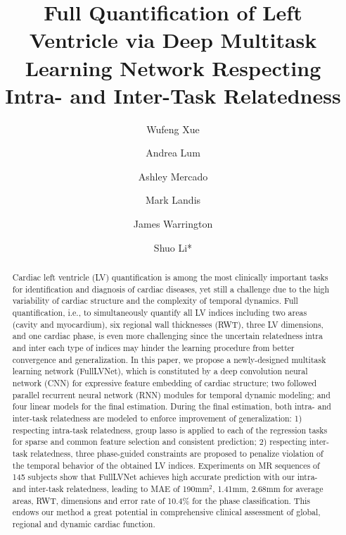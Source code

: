\documentclass{llncs}
\begin{document}
%
\mainmatter              %
%
\title{Full Quantification of Left Ventricle via Deep Multitask Learning Network Respecting \\Intra- and Inter-Task Relatedness}

\author{Wufeng Xue \and Andrea Lum \and Ashley Mercado \and Mark Landis \and James Warrington \and Shuo Li*}

\maketitle              %


\begin{abstract}
Cardiac left ventricle (LV) quantification is among the most clinically important tasks for identification and diagnosis of cardiac diseases, yet still a challenge due to the high variability of cardiac structure and the complexity of temporal dynamics. Full quantification, i.e., to simultaneously quantify all LV indices including two areas (cavity and myocardium), six regional wall thicknesses (RWT), three LV dimensions, and one cardiac phase, is even more challenging since the uncertain relatedness intra and inter each type of indices may hinder the learning procedure from better convergence and generalization. 
In this paper, we propose a newly-designed multitask learning network (FullLVNet), which is constituted by a deep convolution neural network (CNN) for expressive feature embedding of cardiac structure; two followed parallel recurrent neural network (RNN) modules for temporal dynamic modeling; and four linear models for the final estimation. During the final estimation, both intra- and inter-task relatedness are modeled to enforce improvement of generalization: 1) respecting intra-task relatedness, group lasso is applied to each of the regression tasks for sparse and common feature selection and consistent prediction; 2) respecting inter-task relatedness, three phase-guided constraints are proposed to penalize violation of the temporal behavior of the obtained LV indices. Experiments on MR sequences of 145 subjects show that FullLVNet achieves high accurate prediction with our intra- and inter-task relatedness, leading to MAE of 190mm$^2$, 1.41mm, 2.68mm for average areas, RWT, dimensions and error rate of 10.4\% for the phase classification. This endows our method a great potential in comprehensive clinical assessment of global, regional and dynamic cardiac function.

\end{abstract}
\end{document}
